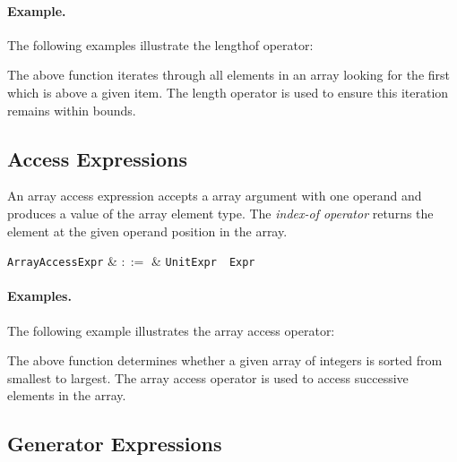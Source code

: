 \paragraph{Example.} The following examples illustrate the lengthof operator:



The above function iterates through all elements in an array looking for the first which is above a given item.  The length operator is used to ensure this iteration remains within bounds.


\subsection{Access Expressions}
\label{c_expr_array_access}

An array access expression accepts a array argument with one operand and produces a value of the array element type.  The {\em index-of operator} returns the element at the given operand position in the array.  

\begin{syntax}
  \verb+ArrayAccessExpr+ & $::=$ & \verb+UnitExpr+\ \token{[}\ \verb+Expr+\ \token{]}\\
\end{syntax}

\paragraph{Examples.} The following example illustrates the array access operator:



The above function determines whether a given array of integers is sorted from smallest to largest.  The array access operator is used to access successive elements in the array. 


\subsection{Generator Expressions}
\label{c_expr_generator}

